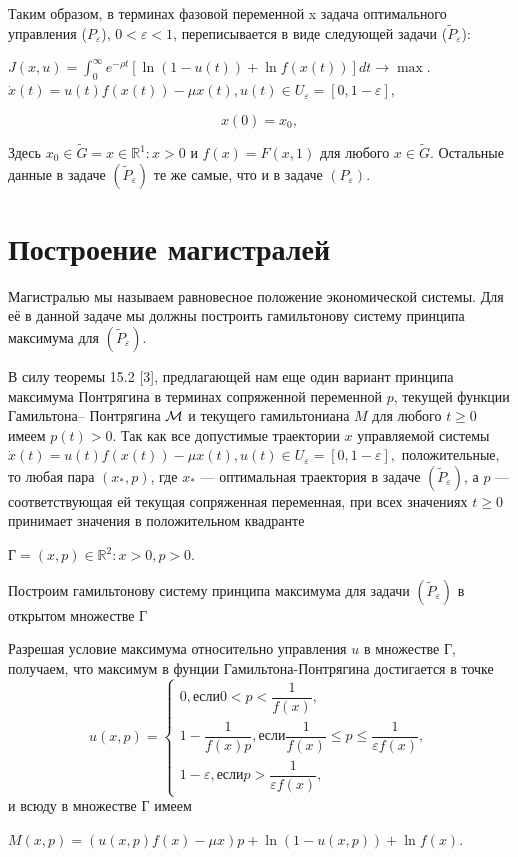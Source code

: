 Таким образом, в терминах фазовой переменной x задача оптимального управления ($P_\varepsilon$), $ 0 <\varepsilon<1 $, переписывается в виде следующей задачи ($\tilde{P}_\varepsilon$):
\begin{center}
	$ J(x,u) = \int_{0}^{\infty}
	e^{-\rho t}[\ln(1-u(t))+\ln f(x(t))]dt \rightarrow \max.$\\
	$ \dot{x}(t) = u(t) f(x(t))-\mu x(t),u (t)\in U_\varepsilon = [0 ,1-\varepsilon], $\\
\end{center}
\begin{equation}
x(0) = x_0,
\end{equation}

Здесь $ x_0\in \tilde{G} = {x \in \mathbb{R}^1: x>0} $ и $ f(x)=F(x,1) $ для любого $ x \in \tilde{G}. $ Остальные данные в задаче $ (\tilde{P}_\varepsilon) $ те же самые, что и в задаче $ ( P_\varepsilon) $.\\
\section{Построение магистралей}
Магистралью мы называем равновесное положение экономической системы. Для её в данной задаче мы должны построить гамильтонову систему принципа максимума для $(\tilde{P}_\varepsilon)$. 

В силу теоремы 15.2 [3], предлагающей нам еще один вариант принципа максимума Понтрягина в терминах сопряженной переменной $ p $, текущей функции Гамильтона–
Понтрягина $ \cal{M} $ и текущего гамильтониана $ M $ для любого $ t \ge 0 $ имеем $ p(t) > 0 $. Так как все допустимые траектории $ x $
управляемой системы $ \dot{x}(t) = u(t) f(x(t))-\mu x(t),u (t)\in U_\varepsilon = [0 ,1-\varepsilon], $ положительные, то любая пара $ (x_*,p) $, где $ x_* $ — оптимальная траектория в задаче $ (\tilde{P}_\varepsilon) $, а $ p $ — соответствующая ей текущая сопряженная переменная, при
всех значениях $ t \ge 0 $ принимает значения в положительном квадранте
\begin{center}
	Г$  = {(x,p) \in \mathbb{R}^2 : x > 0, p > 0.} $
\end{center}

Построим гамильтонову систему принципа максимума для задачи $(\tilde{P}_\varepsilon)$ в открытом множестве Г

Разрешая условие максимума относительно управления $ u $ в множестве Г, получаем, что максимум в фунции Гамильтона-Понтрягина достигается в точке
\begin{equation*}
u(x,p)= 
\begin{cases}
0, если 0 < p < \dfrac{1}{f(x)},\\
1 - \dfrac{1}{f(x)p}, если \dfrac{1}{f(x)} \le p \le \dfrac{1}{\varepsilon f(x)},\\
1 - \varepsilon, если p > \dfrac{1}{\varepsilon f(x)},
\end{cases}
\end{equation*}
и всюду в множестве Г имеем
\begin{center}
	$ M(x,p)=(u(x,p)f(x) - \mu x) p + \ln(1 - u(x,p)) + \ln f(x). $
\end{center}

